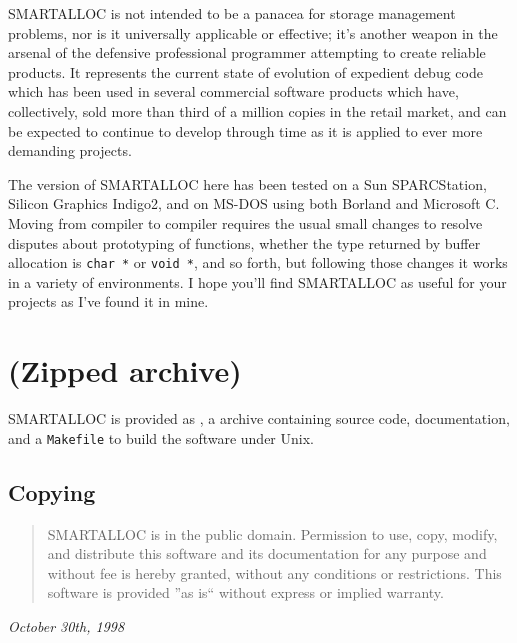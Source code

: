 SMARTALLOC is not intended to be a panacea for storage management problems,
nor is it universally applicable or effective; it's another weapon in the
arsenal of the defensive professional programmer attempting to create reliable
products. It represents the current state of evolution of expedient debug code
which has been used in several commercial software products which have,
collectively, sold more than third of a million copies in the retail market,
and can be expected to continue to develop through time as it is applied to
ever more demanding projects. 

The version of SMARTALLOC here has been tested on a Sun SPARCStation, Silicon
Graphics Indigo2, and on MS-DOS using both Borland and Microsoft C. Moving
from compiler to compiler requires the usual small changes to resolve disputes
about prototyping of functions, whether the type returned by buffer allocation
is {\tt char\ *} or {\tt void\ *}, and so forth, but following those changes
it works in a variety of environments. I hope you'll find SMARTALLOC as useful
for your projects as I've found it in mine. 

\section{
(Zipped archive)}

SMARTALLOC is provided as 
, a  
 archive containing  source code,
documentation, and a  {\tt Makefile} to build the software under Unix. 

\subsection{ Copying}

\begin{quote}
SMARTALLOC is in the public domain. Permission to use, copy, modify, and
distribute this software and its documentation for any purpose and without fee
is hereby granted, without any conditions or restrictions. This software is
provided ''as is`` without express or implied warranty. 
\end{quote}

{\it 
{}
October 30th, 1998 } 
